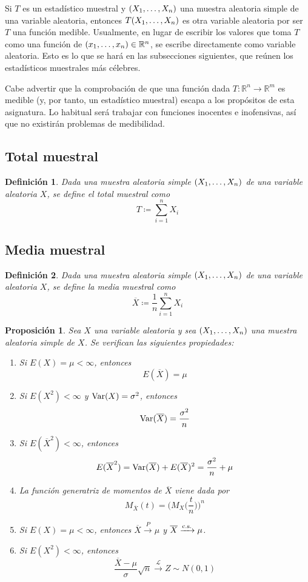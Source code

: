 \documentclass[11pt]{report}
\newtheorem{proposition}{Proposición}
\newtheorem{definition}{Definición}
\theoremstyle{definition}
\newcommand{\R}{\mathbb R}
\begin{document}
Si $T$ es un estadístico muestral y $(X_1,\mathellipsis,X_n)$ una muestra aleatoria simple de una variable aleatoria, entonces $T(X_1,\mathellipsis,X_n)$ es otra variable aleatoria por ser $T$ una función medible. Usualmente, en lugar de escribir los valores que toma $T$ como una función de $(x_1,\mathellipsis,x_n) \in \R^n$, se escribe directamente como variable aleatoria. Esto es lo que se hará en las subsecciones siguientes, que reúnen los estadísticos muestrales más célebres.

Cabe advertir que la comprobación de que una función dada $T \colon \R^n \to \R^m$ es medible (y, por tanto, un estadístico muestral) escapa a los propósitos de esta asignatura. Lo habitual será trabajar con funciones inocentes e inofensivas, así que no existirán problemas de medibilidad.

\subsection{Total muestral}

\begin{definition}
Dada una muestra aleatoria simple $(X_1,\mathellipsis,X_n)$ de una variable aleatoria $X$, se define el \emph{total muestral} como
\[T \coloneqq \sum_{i=1}^n X_i\]
\end{definition}

\subsection{Media muestral}

\begin{definition}
Dada una muestra aleatoria simple $(X_1,\mathellipsis,X_n)$ de una variable aleatoria $X$, se define la \emph{media muestral} como
\[\overline{X}\coloneqq\frac{1}{n}\sum_{i=1}^n X_i\]
\end{definition}

\begin{proposition}
Sea $X$ una variable aleatoria y sea $(X_1,\mathellipsis,X_n)$ una muestra aleatoria simple de $X$. Se verifican las siguientes propiedades:
\begin{enumerate}
    \item Si $E(X)=\mu< \infty$, entonces \[E(\overline{X})=\mu\]
    \item Si $E(X^2)<\infty$ y $\textup{Var}(X) = \sigma^2$, entonces
    \[\textup{Var}(\overline{X})=\frac{\sigma^2}{n}\]
    \item Si $E(\overline{X}^2) < \infty$, entonces \[E(\overline{X}^2) = \textup{Var}(\overline{X})+E(\overline{X})^2= \frac{\sigma^2}{n}+\mu\]
    \item La función generatriz de momentos de $\overline{X}$ viene dada por \[M_{\overline{X}}(t)=\biggl(M_{X}\biggl(\frac{t}{n}\biggr)\biggr)^n\]
    \item Si $E(X)=\mu < \infty$, entonces $\overline{X} \xrightarrow{P} \mu$ y $\overline{X} \xrightarrow{\textup{c.s.}} \mu$.
    \item Si $E(X^2) < \infty$, entonces
    \[\frac{\overline{X}-\mu}{\sigma}\sqrt{n} \xrightarrow{\mathcal{L}}Z \sim N(0,1)\]
\end{enumerate}
\end{proposition}
\end{document}
